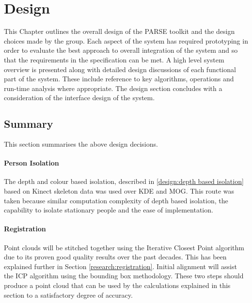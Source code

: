 \chapter{Design}
\label{design}
This Chapter outlines the overall design of the PARSE toolkit and the design choices made by the group. Each aspect of the system has required prototyping in order to evaluate the best approach to overall integration of the system and so that the requirements in the specification can be met. A high level system overview is presented along with detailed design discussions of each functional part of the system. These include reference to key algorithms, operations and run-time analysis where appropriate. The design section concludes with a consideration of the interface design of the system.











\newpage
\section{Summary}
This section summarises the above design decisions.\\

\subsubsection{Person Isolation}
The depth and colour based isolation, described in \ref{design:depth based isolation} based on Kinect skeleton data was used over KDE and MOG. This route was taken because similar computation complexity of depth based isolation, the capability to isolate stationary people and the ease of implementation.\\

\subsubsection{Registration}
Point clouds will be stitched together using the Iterative Closest Point algorithm due to its proven good quality results over the past decades. This has been explained further in Section \ref{research:registration}. Initial alignment will assist the ICP algorithm using the bounding box methodology. These two steps should produce a point cloud that can be used by the calculations explained in this section to a satisfactory degree of accuracy. \\

